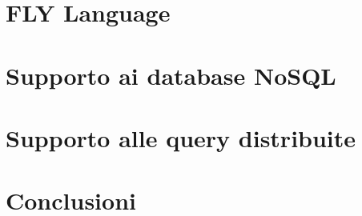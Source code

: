 \documentclass[11pt,oneside]{book}
\begin{document}
\chapter{FLY Language}


\chapter{Supporto ai database NoSQL}


\chapter{Supporto alle query distribuite}


\chapter{Conclusioni}


\nocite{*}
\printbibliography[title={Bibliografia}]

\end{document}
